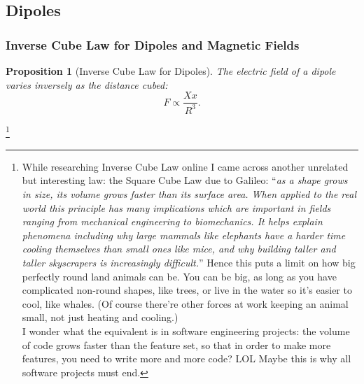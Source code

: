 \documentclass[12pt]{article}
\theoremstyle{plain}
\newtheorem{proposition}[theorem]{Proposition}
\theoremstyle{definition}
\theoremstyle{remark}
\begin{document}
\subsection{Dipoles}

\subsubsection{Inverse Cube Law for Dipoles and Magnetic Fields}

\begin{mdframed}
\begin{proposition}[Inverse Cube Law for Dipoles]
The electric field of a dipole varies inversely as the distance cubed: $$F \propto \frac{Xx}{R^3}.$$
\end{proposition}
\end{mdframed}
\footnote{While researching Inverse Cube Law online I came across another unrelated but interesting law: the Square Cube Law due to Galileo: ``\textit{as a shape grows in size, its volume grows faster than its surface area. When applied to the real world this principle has many implications which are important in fields ranging from mechanical engineering to biomechanics. It helps explain phenomena including why large mammals like elephants have a harder time cooling themselves than small ones like mice, and why building taller and taller skyscrapers is increasingly difficult.}'' Hence this puts a limit on how big perfectly round land animals can be. You can be big, as long as you have complicated non-round shapes, like trees, or live in the water so it's easier to cool, like whales. (Of course there're other forces at work keeping an animal small, not just heating and cooling.)\\ \indent I wonder what the equivalent is in software engineering projects: the volume of code grows faster than the feature set, so that in order to make more features, you need to write more and more code? LOL Maybe this is why all software projects must end.}
\end{document}
